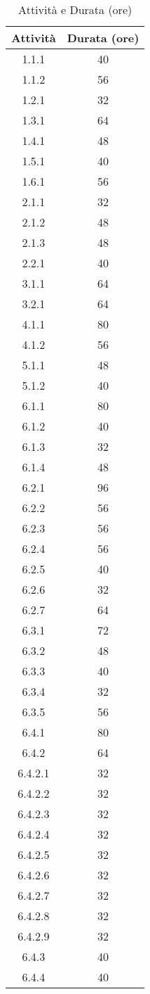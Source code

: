 \begin{table}[H]
    \centering
    \begin{tabular}{|c|c|}
    \hline
    \textbf{Attività} & \textbf{Durata (ore)} \\
    \hline
    1.1.1 & 40 \\
    1.1.2 & 56 \\
    1.2.1 & 32 \\
    1.3.1 & 64 \\
    1.4.1 & 48 \\
    1.5.1 & 40 \\
    1.6.1 & 56 \\
    2.1.1 & 32 \\
    2.1.2 & 48 \\
    2.1.3 & 48 \\
    2.2.1 & 40 \\
    3.1.1 & 64 \\
    3.2.1 & 64 \\
    4.1.1 & 80 \\
    4.1.2 & 56 \\
    5.1.1 & 48 \\
    5.1.2 & 40 \\
    6.1.1 & 80 \\
    6.1.2 & 40 \\
    6.1.3 & 32 \\
    6.1.4 & 48 \\
    6.2.1 & 96 \\
    6.2.2 & 56 \\
    6.2.3 & 56 \\
    6.2.4 & 56 \\
    6.2.5 & 40 \\
    6.2.6 & 32 \\
    6.2.7 & 64 \\
    6.3.1 & 72 \\
    6.3.2 & 48 \\
    6.3.3 & 40 \\
    6.3.4 & 32 \\
    6.3.5 & 56 \\
    6.4.1 & 80 \\
    6.4.2 & 64 \\
    6.4.2.1 & 32 \\
    6.4.2.2 & 32 \\
    6.4.2.3 & 32 \\
    6.4.2.4 & 32 \\
    6.4.2.5 & 32 \\
    6.4.2.6 & 32 \\
    6.4.2.7 & 32 \\
    6.4.2.8 & 32 \\
    6.4.2.9 & 32 \\
    6.4.3 & 40 \\
    6.4.4 & 40 \\
    \hline
    \end{tabular}
    \caption{Attività e Durata (ore)}
    \label{tab:attivita-durata}
    \end{table}

